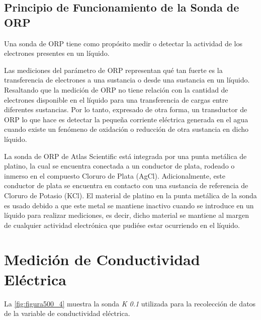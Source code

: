 \subsection{Principio de Funcionamiento de la Sonda de ORP}

Una sonda de ORP tiene como propósito medir o detectar la actividad de los electrones presentes en un líquido.

Las mediciones del parámetro de ORP representan qué tan fuerte es la transferencia de electrones a una sustancia o desde una sustancia en un líquido. Resaltando que la medición de ORP no tiene relación con la cantidad de 
electrones disponible en el líquido para una transferencia de cargas entre diferentes sustancias. Por lo tanto, expresado de otra forma, un transductor de ORP lo que hace es detectar la pequeña corriente eléctrica generada 
en el agua cuando existe un fenómeno de oxidación o reducción de otra sustancia en dicho líquido.

La sonda de ORP de Atlas Scientific está integrada por una punta metálica de platino, la cual se encuentra conectada a un conductor de plata, rodeado o inmerso en el compuesto Cloruro de Plata (AgCl). Adicionalmente, este 
conductor de plata se encuentra en contacto con una sustancia de referencia de Cloruro de Potasio (KCl). El material de platino en la punta metálica de la sonda es usado debido a que este metal se mantiene inactivo cuando se 
introduce en un líquido para realizar mediciones, es decir, dicho material se mantiene al margen de cualquier actividad electrónica que pudiése estar ocurriendo en el líquido.

\clearpage

\section{Medición de Conductividad Eléctrica}

La \autoref{fig:figura500_4} muestra la sonda \textit{K 0.1} utilizada para la recolección de datos de la variable de conductividad eléctrica.

